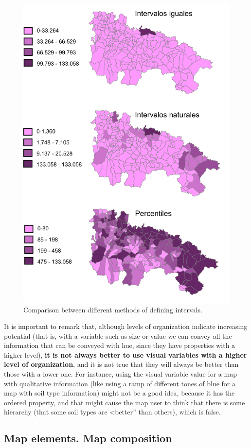 \begin{itemize}
	\begin{figure}[!hbt]
	\centering
	\includegraphics[width=.7\columnwidth]{Visualization/IntervalClasses.pdf}
	\caption{\small Comparison between different methods of defining intervals.}
	\label{Fig:IntervalClasses} 
	\end{figure}


\end{itemize}


It is important to remark that, although levels of organization indicate increasing potential (that is, with a variable such as size or value we can convey all the information that can be conveyed with hue, since they have properties with a higher level), \textbf{it is not always better to use visual variables with a higher level of organization}, and it is not true that they will always be better than those with a lower one. For instance, using the visual variable value for a map with qualitative information (like using a ramp of different tones of blue for a map with soil type information) might not be a good idea, because it has the ordered property, and that might cause the map user to think that there is some hierarchy (that some soil types are <better'' than others), which is false.


\subsection{Map elements. Map composition}

